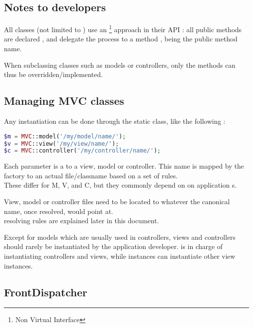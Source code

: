 \documentclass[pdftex,12pt,a4paper]{article}
\begin{document}
\subsection{Notes to developers} \label{sec:notes-to-developers}

All classes (not limited to ) use an \footnote{Non Virtual Interface} approach in their API : all public methods are declared , and delegate the process to a  method ,  being the public method name.

When subclassing  classes such as models or controllers, only the  methods can thus be overridden/implemented.

\subsection{Managing MVC classes} \label{sec:managing-mvc-classes}

Any instantiation can be done through the  static class, like the following :
\begin{lstlisting}[label=mvc-class-code,caption=Retrieving MVC classes,language=PHP]
$m = MVC::model('/my/model/name/');
$v = MVC::view('/my/view/name/');
$c = MVC::controller('/my/controller/name/');
\end{lstlisting}

Each parameter is a  to a view, model or controller.
This name is mapped by the factory to an actual file/classname based on a set of rules. \\
These differ for M, V, and C, but they commonly depend on on application s.

View, model or controller files need to be located to whatever the canonical name, once resolved, would point at. \\
 resolving rules are explained later in this document.

Except for models which are usually used in controllers, views and controllers should rarely be instantiated by the application developer.
 is in charge of instantiating controllers and views, while  instances can instantiate other view instances.

\subsection{FrontDispatcher} \label{sec:frontdispatcher-dispatch-request}
\end{document}
